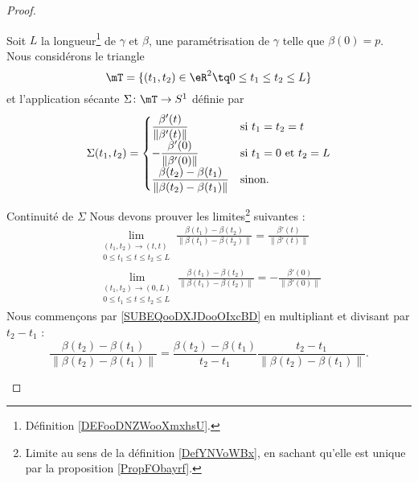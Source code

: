 \begin{proof}
\begin{subproof}
            Soit \( L\) la longueur\footnote{Définition \ref{DEFooDNZWooXmxhsU}.} de \( \gamma\) et \( \beta\), une paramétrisation de \( \gamma\) telle que \( \beta(0)=p\). Nous considérons le triangle
            \begin{equation}
                \mT=\{ (t_1,t_2)\in \eR^2\tq 0\leq t_1\leq t_2\leq L \}
            \end{equation}
            et l'application sécante \( \Sigma\colon \mT\to S^1\) définie par
            \begin{equation}
                \Sigma(t_1,t_2)=\begin{cases}
                    \dfrac{ \beta'(t) }{ \| \beta'(t) \| }    &   \text{si \( t_1=t_2=t\)}\\
                    -\dfrac{ \beta'(0) }{ \| \beta'(0) \| }    &   \text{si \( t_1=0\) et \( t_2=L\)}\\
                    \dfrac{ \beta(t_2)-\beta(t_1) }{ \| \beta(t_2)-\beta(t_1) \| }    &   \text{sinon}.
                \end{cases}
            \end{equation}
    \item[Continuité de \( \Sigma\)]
        Nous devons prouver les limites\footnote{Limite au sens de la définition \ref{DefYNVoWBx}, en sachant qu'elle est unique par la proposition \ref{PropFObayrf}.} suivantes :
        \begin{subequations}
            \begin{align}
                \lim_{\substack{(t_1,t_2)\to (t,t)\\0\leq t_1\leq t\leq t_2\leq L}}\frac{ \beta(t_1)-\beta(t_2) }{ \| \beta(t_1)-\beta(t_2) \| }=\frac{ \beta'(t) }{ \| \beta'(t) \| }      \label{SUBEQooDXJDooOIxcBD}  \\
                \lim_{\substack{(t_1,t_2)\to (0,L)\\0\leq t_1\leq t\leq t_2\leq L}}\frac{ \beta(t_1)-\beta(t_2) }{ \| \beta(t_1)-\beta(t_2) \| }=-\frac{ \beta'(0) }{ \| \beta'(0) \| }        \label{SUBEQooOXGSooXHEHHh}
            \end{align}
        \end{subequations}
        Nous commençons par \eqref{SUBEQooDXJDooOIxcBD} en multipliant et divisant par \( t_2-t_1\) :
        \begin{equation}
            \frac{ \beta(t_2)-\beta(t_1) }{ \|  \beta(t_2)-\beta(t_1)  \| }=\frac{  \beta(t_2)-\beta(t_1)  }{ t_2-t_1 }\frac{ t_2-t_1 }{ \|  \beta(t_2)-\beta(t_1)  \| }.
        \end{equation}

\end{subproof}
\end{proof}
